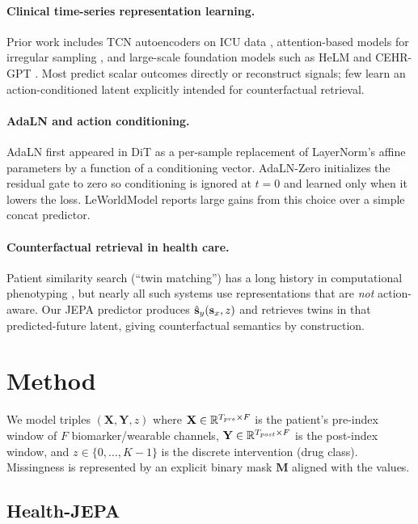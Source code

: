 \paragraph{Clinical time-series representation learning.} Prior work
includes TCN autoencoders on ICU data \citep{shukla2019tcnae},
attention-based models for irregular sampling
\citep{horn2019setfunctions, shukla2021multitime}, and large-scale
foundation models such as HeLM and CEHR-GPT
\citep{pang2021cehr,sarma2024helm}. Most predict scalar outcomes
directly or reconstruct signals; few learn an action-conditioned latent
explicitly intended for counterfactual retrieval.

\paragraph{AdaLN and action conditioning.} AdaLN first appeared in DiT
\citep{peebles2023dit} as a per-sample replacement of LayerNorm's affine
parameters by a function of a conditioning vector. AdaLN-Zero
initializes the residual gate to zero so conditioning is ignored at
$t{=}0$ and learned only when it lowers the loss. LeWorldModel reports
large gains from this choice over a simple concat predictor.

\paragraph{Counterfactual retrieval in health care.} Patient similarity
search (``twin matching'') has a long history in computational phenotyping
\citep{suresh2017twin,mcdermott2021twin}, but nearly all such systems
use representations that are \emph{not} action-aware. Our JEPA predictor
produces $\hat{\mathbf{s}}_y(\mathbf{s}_x, z)$ and retrieves twins in that predicted-future
latent, giving counterfactual semantics by construction.

\section{Method}
\label{sec:method}

We model triples $(\mathbf{X}, \mathbf{Y}, z)$ where
$\mathbf{X} \in \mathbb{R}^{T_{pre} \times F}$ is the patient's pre-index window
of $F$ biomarker/wearable channels,
$\mathbf{Y} \in \mathbb{R}^{T_{post} \times F}$ is the post-index window, and
$z \in \{0, \ldots, K-1\}$ is the discrete intervention (drug class).
Missingness is represented by an explicit binary mask
$\mathbf{M}$ aligned with the values.

\subsection{Health-JEPA}


